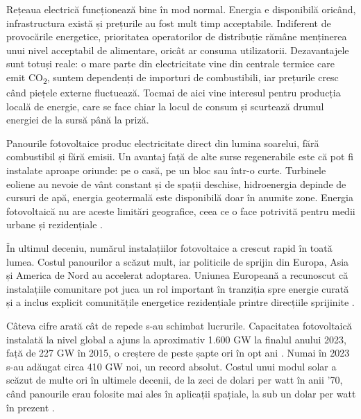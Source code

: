 \documentclass[12pt,a4paper]{report}
\begin{document}
Rețeaua electrică funcționează bine în mod normal. Energia e disponibilă oricând, infrastructura există și prețurile au fost mult timp acceptabile. Indiferent de provocările energetice, prioritatea operatorilor de distribuție rămâne menținerea unui nivel acceptabil de alimentare, oricât ar consuma utilizatorii. Dezavantajele sunt totuși reale: o mare parte din electricitate vine din centrale termice care emit CO\textsubscript{2}, suntem dependenți de importuri de combustibili, iar prețurile cresc când piețele externe fluctuează. Tocmai de aici vine interesul pentru producția locală de energie, care se face chiar la locul de consum și scurtează drumul energiei de la sursă până la priză.

Panourile fotovoltaice produc electricitate direct din lumina soarelui, fără combustibil și fără emisii. Un avantaj față de alte surse regenerabile este că pot fi instalate aproape oriunde: pe o casă, pe un bloc sau într-o curte. Turbinele eoliene au nevoie de vânt constant și de spații deschise, hidroenergia depinde de cursuri de apă, energia geotermală este disponibilă doar în anumite zone. Energia fotovoltaică nu are aceste limitări geografice, ceea ce o face potrivită pentru medii urbane și rezidențiale \cite{duffie2020solar}.

În ultimul deceniu, numărul instalațiilor fotovoltaice a crescut rapid în toată lumea. Costul panourilor a scăzut mult, iar politicile de sprijin din Europa, Asia și America de Nord au accelerat adoptarea. Uniunea Europeană a recunoscut că instalațiile comunitare pot juca un rol important în tranziția spre energie curată și a inclus explicit comunitățile energetice rezidențiale printre direcțiile sprijinite \cite{barabino2023energycommunities, europeansolarstrategy2022}.

Câteva cifre arată cât de repede s-au schimbat lucrurile. Capacitatea fotovoltaică instalată la nivel global a ajuns la aproximativ 1.600 GW la finalul anului 2023, față de 227 GW în 2015, o creștere de peste șapte ori în opt ani \cite{ieapvps2024}. Numai în 2023 s-au adăugat circa 410 GW noi, un record absolut. Costul unui modul solar a scăzut de multe ori în ultimele decenii, de la zeci de dolari per watt în anii '70, când panourile erau folosite mai ales în aplicații spațiale, la sub un dolar per watt în prezent \cite{duffie2020solar}.
\end{document}
